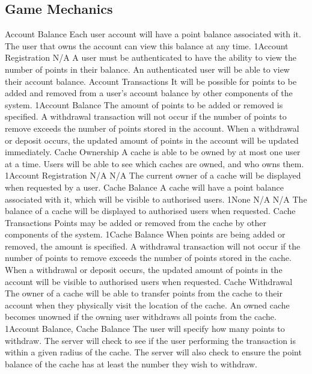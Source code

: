 	\subsection{Game Mechanics}
		\funcreq
			{Account Balance}
			{Each user account will have a point balance associated with it. 
			The user that owns the account can view this balance at any time.}
			{1}{Account Registration}
			{N/A}
			{A user must be authenticated to have the ability to view the 
			number of points in their balance.}
			{An authenticated user will be able to view their account balance.}
		\funcreq
			{Account Transactions}
			{It will be possible for points to be added and removed from a 
			user's account balance by other components of the system.}
			{1}{Account Balance}
			{The amount of points to be added or removed is specified.}
			{A withdrawal transaction will not occur if the number of points 
			to remove exceeds the number of points stored in the account.}
			{When a withdrawal or deposit occurs, the updated amount of points 
			in the account will be updated immediately.}
		\funcreq
			{Cache Ownership}
			{A cache is able to be owned by at most one user at a time. Users 
			will be able to see which caches are owned, and who owns them.}
			{1}{Account Registration}
			{N/A}
			{N/A}
			{The current owner of a cache will be displayed when requested by 
			a user.}
		\funcreq
			{Cache Balance}
			{A cache will have a point balance associated with it, which will 
			be visible to authorised users.}
			{1}{None}
			{N/A}
			{N/A}
			{The balance of a cache will be displayed to authorised users when 
			requested.}
		\funcreq
			{Cache Transactions}
			{Points may be added or removed from the cache by other components 
			of the system.}
			{1}{Cache Balance}
			{When points are being added or removed, the amount is specified.}
			{A withdrawal transaction will not occur if the number of points 
			to remove exceeds the number of points stored in the cache.}
			{When a withdrawal or deposit occurs, the updated amount of points 
			in the account will be visible to authorised users when requested.}
		\funcreq
			{Cache Withdrawal}
			{The owner of a cache will be able to transfer points from the 
			cache to their account when they physically visit the location of 
			the cache. An owned cache becomes unowned if the owning user 
			withdraws all points from the cache.}
			{1}{Account Balance, Cache Balance}
			{The user will specify how many points to withdraw.}
			{The server will check to see if the user performing the 
			transaction is within a given radius of the cache. The server will also check to ensure the point balance of the cache has at least the number 
			they wish to withdraw.}
